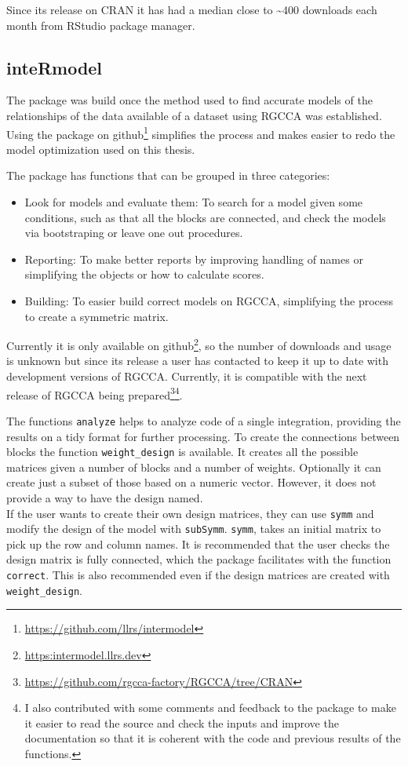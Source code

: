\documentclass[
  a4paper,
]{book}
\DeclareRobustCommand{\href}[2]{#2\footnote{\url{#1}}}
\begin{document}
Since its release on CRAN it has had a median close to \textasciitilde400 downloads each month from RStudio package manager.

\hypertarget{intermodel}{%
\subsection{inteRmodel}\label{intermodel}}

The package was build once the method used to find accurate models of the relationships of the data available of a dataset using RGCCA was established.
Using the package \href{https://github.com/llrs/intermodel}{on github} simplifies the process and makes easier to redo the model optimization used on this thesis.

The package has functions that can be grouped in three categories:

\begin{itemize}
\item
  Look for models and evaluate them:
  To search for a model given some conditions, such as that all the blocks are connected, and check the models via bootstraping or leave one out procedures.
\item
  Reporting: To make better reports by improving handling of names or simplifying the objects or how to calculate scores.
\item
  Building: To easier build correct models on RGCCA, simplifying the process to create a symmetric matrix.
\end{itemize}

Currently it is only \href{https:intermodel.llrs.dev}{available on github}, so the number of downloads and usage is unknown but since its release a user has contacted to keep it up to date with development versions of RGCCA.
Currently, it is compatible with the next release of \href{https://github.com/rgcca-factory/RGCCA/tree/CRAN}{RGCCA being prepared}\footnote{I also contributed with some comments and feedback to the package to make it easier to read the source and check the inputs and improve the documentation so that it is coherent with the code and previous results of the functions.}.

The functions \texttt{analyze} helps to analyze code of a single integration, providing the results on a tidy format for further processing.
To create the connections between blocks the function \texttt{weight\_design} is available.
It creates all the possible matrices given a number of blocks and a number of weights.
Optionally it can create just a subset of those based on a numeric vector.
However, it does not provide a way to have the design named.\\
If the user wants to create their own design matrices, they can use \texttt{symm} and modify the design of the model with \texttt{subSymm}.
\texttt{symm}, takes an initial matrix to pick up the row and column names.
It is recommended that the user checks the design matrix is fully connected, which the package facilitates with the function \texttt{correct}.
This is also recommended even if the design matrices are created with \texttt{weight\_design}.
\end{document}
